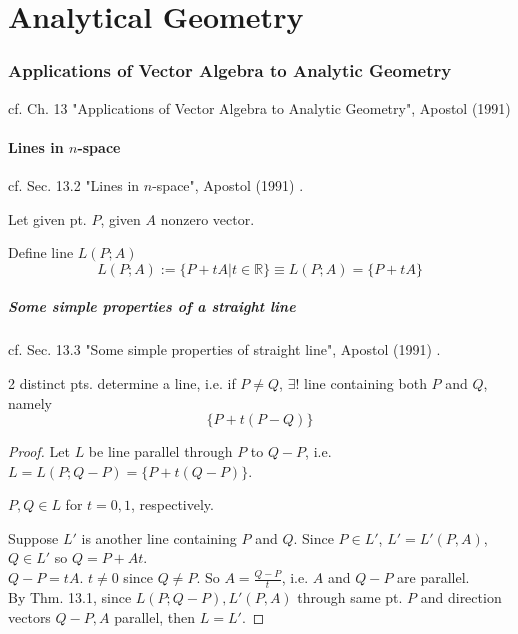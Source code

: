 \part{Analytical Geometry}


\section{Applications of Vector Algebra to Analytic Geometry}

cf. Ch. 13 "Applications of Vector Algebra to Analytic Geometry", Apostol (1991) \cite{dgdt:Apos1991}

\subsection{Lines in $n$-space}

cf. Sec. 13.2 "Lines in $n$-space", Apostol (1991) \cite{dgdt:Apos1991}.

\begin{definition}[Line]
	Let given pt. $P$, given $A$ nonzero vector. 
	
	Define line $L(P;A)$
	\begin{equation}
		L(P;A) := \lbrace P + tA | t\in \mathbb{R} \rbrace \equiv L(P;A) = \lbrace P + tA \rbrace
	\end{equation}
\end{definition}

\subsubsection{Some simple properties of a straight line}

cf. Sec. 13.3 "Some simple properties of straight line", Apostol (1991) \cite{dgdt:Apos1991}.

\begin{theorem}
	2 distinct pts. determine a line, i.e. if $P\neq Q$, $\exists !$ line containing both $P$ and $Q$, namely
	\begin{equation}
		\lbrace P + t(P- Q) \rbrace
	\end{equation}
\end{theorem}

\begin{proof}
Let $L$ be line parallel through $P$ to $Q-P$, i.e. $L= L(P;Q-P)= \lbrace P + t(Q-P) \rbrace$.

$P,Q \in L$ for $t=0,1$, respectively.

Suppose $L'$ is another line containing $P$ and $Q$. Since $P \in L'$, $L' = L'(P,A)$, $Q \in L'$ so $Q = P + At$. \\
$Q - P = tA$. $t\neq 0$ since $Q \neq P$. So $A = \frac{Q- P}{t}$, i.e. $A$ and $Q-P$ are parallel. \\

By Thm. 13.1, since $L(P;Q-P), L'(P,A)$ through same pt. $P$ and direction vectors $Q-P,A$ parallel, then $L=L'$.

\end{proof}


